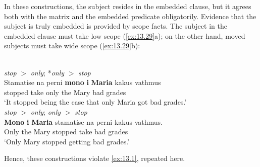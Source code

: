 \documentclass[output=paper]{langsci/langscibook}
\begin{document}
In these constructions, the subject resides in the embedded clause, but it
agrees both with the matrix and the embedded predicate obligatorily. Evidence
that the subject is truly embedded is provided by scope facts. The subject in
the embedded clause must take low scope (\ref{ex:13.29}a); on the other hand,
moved subjects must take wide scope (\ref{ex:13.29}b):

\ea%
    \label{ex:13.29} \parencite[(41), (63)]{AleAnaIorMar2012}\\
	\ea \emph{stop} $>$ \emph{only}; *\emph{only} $>$ \emph{stop}\\
	\gll  Stamatise na perni  \textbf{mono} \textbf{i} \textbf{Maria}  kakus vathmus\\
	    stopped \Sbjv{} take only the Mary bad grades\\
	\glt ‘It stopped being the case that only Maria got bad grades.’\\
	\ex \makebox[0pt][r]{*}\emph{stop} $>$ \emph{only}; \emph{only} $>$ \emph{stop}\\
	\gll  \textbf{Mono} \textbf{i} \textbf{Maria} stamatise na perni kakus vathmus.\\
	    Only the Mary stopped \Sbjv{} take bad grades\\
	\glt   ‘Only Mary stopped getting bad grades.’
    \z
\z

Hence, these constructions violate \eqref{ex:13.1}, repeated here.
\end{document}
